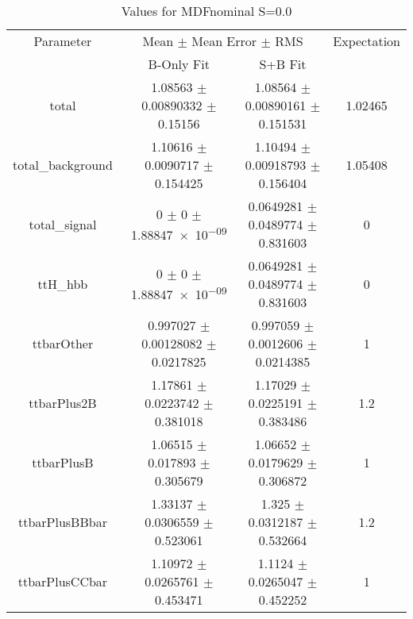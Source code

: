 \begin{table}
\centering
\caption{Values for MDFnominal S=0.0}
\begin{tabular}{cccc}
\toprule
Parameter & \multicolumn{2}{c}{Mean $\pm$ Mean Error $\pm$ RMS} & Expectation\\
 & B-Only Fit & S+B Fit & \\
\midrule
total & \num{1.08563} $\pm$ \num{0.00890332} $\pm$ \num{0.15156} & \num{1.08564} $\pm$ \num{0.00890161} $\pm$ \num{0.151531} & \num{1.02465}\\
total\_background & \num{1.10616} $\pm$ \num{0.0090717} $\pm$ \num{0.154425} & \num{1.10494} $\pm$ \num{0.00918793} $\pm$ \num{0.156404} & \num{1.05408}\\
total\_signal & \num{0} $\pm$ \num{0} $\pm$ \num{1.88847e-09} & \num{0.0649281} $\pm$ \num{0.0489774} $\pm$ \num{0.831603} & \num{0}\\
ttH\_hbb & \num{0} $\pm$ \num{0} $\pm$ \num{1.88847e-09} & \num{0.0649281} $\pm$ \num{0.0489774} $\pm$ \num{0.831603} & \num{0}\\
ttbarOther & \num{0.997027} $\pm$ \num{0.00128082} $\pm$ \num{0.0217825} & \num{0.997059} $\pm$ \num{0.0012606} $\pm$ \num{0.0214385} & \num{1}\\
ttbarPlus2B & \num{1.17861} $\pm$ \num{0.0223742} $\pm$ \num{0.381018} & \num{1.17029} $\pm$ \num{0.0225191} $\pm$ \num{0.383486} & \num{1.2}\\
ttbarPlusB & \num{1.06515} $\pm$ \num{0.017893} $\pm$ \num{0.305679} & \num{1.06652} $\pm$ \num{0.0179629} $\pm$ \num{0.306872} & \num{1}\\
ttbarPlusBBbar & \num{1.33137} $\pm$ \num{0.0306559} $\pm$ \num{0.523061} & \num{1.325} $\pm$ \num{0.0312187} $\pm$ \num{0.532664} & \num{1.2}\\
ttbarPlusCCbar & \num{1.10972} $\pm$ \num{0.0265761} $\pm$ \num{0.453471} & \num{1.1124} $\pm$ \num{0.0265047} $\pm$ \num{0.452252} & \num{1}\\
\bottomrule
\end{tabular}
\end{table}